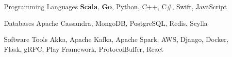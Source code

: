 

\begin{cvskills}

  \cvskill
    {Programming Languages} %
    {{\bf Scala}, {\bf Go}, Python, C++, C\#, Swift, JavaScript} %

  \cvskill
    {Databases} %
    {Apache Cassandra, MongoDB, PostgreSQL, Redis, Scylla} %

  \cvskill
    {Software Tools} %
    {Akka, Apache Kafka, Apache Spark, AWS, Django, Docker, Flask, gRPC, Play Framework, ProtocolBuffer, React} %

\end{cvskills}
